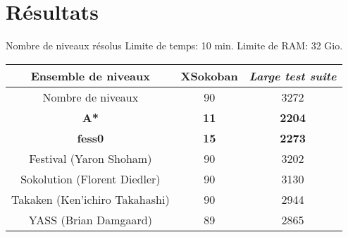     \section{Résultats}
        \begin{frame}{Nombre de niveaux résolus}
            \centering
            Limite de temps: 10 min. Limite de RAM: 32 Gio.

            \vspace{0.42cm}
            \begin{tabular}{|c|c|c|}
                \hline
                Ensemble de niveaux            & XSokoban    & \textit{Large test suite} \\
                \hline
                Nombre de niveaux              & 90          & 3272 \\
                \hline
                \textbf{A*}                    & \textbf{11} & \textbf{2204} \\
                \hline
                \textbf{fess0}                 & \textbf{15} & \textbf{2273} \\
                \hline
                Festival (Yaron Shoham)        & 90          & 3202 \\
                \hline
                Sokolution (Florent Diedler)   & 90          & 3130 \\
                \hline
                Takaken (Ken'ichiro Takahashi) & 90          & 2944 \\
                \hline
                YASS (Brian Damgaard)          & 89          & 2865 \\
                \hline
            \end{tabular}

        \end{frame}

